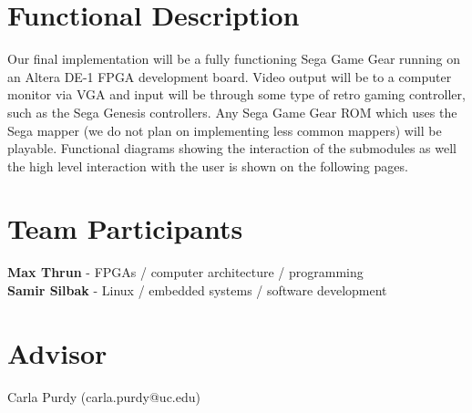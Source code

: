 \documentclass[11pt]{article}
\begin{document}
\section*{Functional Description}
Our final implementation will be a fully functioning Sega Game Gear running on an Altera DE-1 FPGA
development board. Video output will be to a computer monitor via VGA and input will be through some type of retro
gaming controller, such as the Sega Genesis controllers. Any Sega Game Gear ROM which uses the Sega mapper 
(we do not plan on implementing less common mappers) will be playable. Functional diagrams showing the interaction of
the submodules as well the high level interaction with the user is shown on the following pages.

\section*{Team Participants}
{\bf Max Thrun} - FPGAs / computer architecture / programming  
\\
{\bf Samir Silbak} - Linux / embedded systems / software development

\section*{Advisor}
Carla Purdy (carla.purdy@uc.edu)
\end{document}
